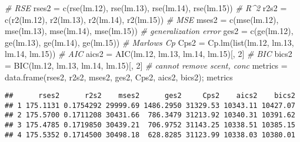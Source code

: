 \documentclass[
]{article}
\newenvironment{Shaded}{\begin{snugshade}}{\end{snugshade}}
\newcommand{\CommentTok}[1]{\textcolor[rgb]{0.56,0.35,0.01}{\textit{#1}}}
\newcommand{\DecValTok}[1]{\textcolor[rgb]{0.00,0.00,0.81}{#1}}
\newcommand{\FloatTok}[1]{\textcolor[rgb]{0.00,0.00,0.81}{#1}}
\newcommand{\FunctionTok}[1]{\textcolor[rgb]{0.00,0.00,0.00}{#1}}
\newcommand{\NormalTok}[1]{#1}
\newcommand{\OtherTok}[1]{\textcolor[rgb]{0.56,0.35,0.01}{#1}}
\begin{document}
\begin{Shaded}
\begin{Highlighting}[]
\CommentTok{\# RSE}
\NormalTok{rses2 }\OtherTok{=} \FunctionTok{c}\NormalTok{(}\FunctionTok{rse}\NormalTok{(lm}\FloatTok{.12}\NormalTok{), }\FunctionTok{rse}\NormalTok{(lm}\FloatTok{.13}\NormalTok{), }\FunctionTok{rse}\NormalTok{(lm}\FloatTok{.14}\NormalTok{), }\FunctionTok{rse}\NormalTok{(lm}\FloatTok{.15}\NormalTok{))}
\CommentTok{\# R\^{}2}
\NormalTok{r2s2 }\OtherTok{=} \FunctionTok{c}\NormalTok{(}\FunctionTok{r2}\NormalTok{(lm}\FloatTok{.12}\NormalTok{), }\FunctionTok{r2}\NormalTok{(lm}\FloatTok{.13}\NormalTok{), }\FunctionTok{r2}\NormalTok{(lm}\FloatTok{.14}\NormalTok{), }\FunctionTok{r2}\NormalTok{(lm}\FloatTok{.15}\NormalTok{))}
\CommentTok{\# MSE}
\NormalTok{mses2 }\OtherTok{=} \FunctionTok{c}\NormalTok{(}\FunctionTok{mse}\NormalTok{(lm}\FloatTok{.12}\NormalTok{), }\FunctionTok{mse}\NormalTok{(lm}\FloatTok{.13}\NormalTok{), }\FunctionTok{mse}\NormalTok{(lm}\FloatTok{.14}\NormalTok{), }\FunctionTok{mse}\NormalTok{(lm}\FloatTok{.15}\NormalTok{))}
\CommentTok{\# generalization error}
\NormalTok{ges2 }\OtherTok{=} \FunctionTok{c}\NormalTok{(}\FunctionTok{ge}\NormalTok{(lm}\FloatTok{.12}\NormalTok{), }\FunctionTok{ge}\NormalTok{(lm}\FloatTok{.13}\NormalTok{), }\FunctionTok{ge}\NormalTok{(lm}\FloatTok{.14}\NormalTok{), }\FunctionTok{ge}\NormalTok{(lm}\FloatTok{.15}\NormalTok{))}
\CommentTok{\# Marlow\textquotesingle{}s Cp}
\NormalTok{Cps2 }\OtherTok{=} \FunctionTok{Cp.lm}\NormalTok{(}\FunctionTok{list}\NormalTok{(lm}\FloatTok{.12}\NormalTok{, lm}\FloatTok{.13}\NormalTok{, lm}\FloatTok{.14}\NormalTok{, lm}\FloatTok{.15}\NormalTok{))}
\CommentTok{\# AIC}
\NormalTok{aics2 }\OtherTok{=} \FunctionTok{AIC}\NormalTok{(lm}\FloatTok{.12}\NormalTok{, lm}\FloatTok{.13}\NormalTok{, lm}\FloatTok{.14}\NormalTok{, lm}\FloatTok{.15}\NormalTok{)[, }\DecValTok{2}\NormalTok{]}
\CommentTok{\# BIC}
\NormalTok{bics2 }\OtherTok{=} \FunctionTok{BIC}\NormalTok{(lm}\FloatTok{.12}\NormalTok{, lm}\FloatTok{.13}\NormalTok{, lm}\FloatTok{.14}\NormalTok{, lm}\FloatTok{.15}\NormalTok{)[, }\DecValTok{2}\NormalTok{]}
\CommentTok{\# cannot remove scent, conc}
\NormalTok{metrics }\OtherTok{=} \FunctionTok{data.frame}\NormalTok{(rses2, r2s2, mses2, ges2, Cps2, aics2, bics2); metrics}
\end{Highlighting}
\end{Shaded}

\begin{verbatim}
##      rses2      r2s2    mses2      ges2     Cps2    aics2    bics2
## 1 175.1131 0.1754292 29999.69 1486.2950 31329.53 10343.11 10427.07
## 2 175.5700 0.1711208 30431.66  786.3479 31213.92 10340.31 10391.62
## 3 175.4785 0.1719850 30439.21  706.9752 31143.25 10338.51 10385.15
## 4 175.5352 0.1714500 30498.18  628.8285 31123.99 10338.03 10380.01
\end{verbatim}
\end{document}

